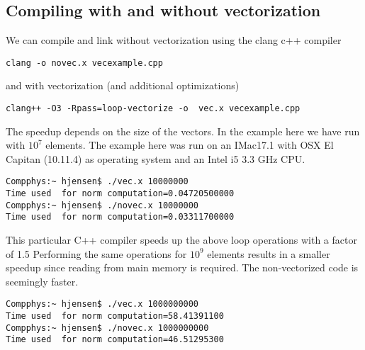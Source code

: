 \documentclass[%
oneside,                 %
final,                   %
10pt]{article}
\begin{document}
\subsection*{Compiling with and without vectorization}
We can compile and link without vectorization using the clang c++ compiler


\begin{verbatim}
clang -o novec.x vecexample.cpp

\end{verbatim}

and with vectorization (and additional optimizations)


\begin{verbatim}
clang++ -O3 -Rpass=loop-vectorize -o  vec.x vecexample.cpp 

\end{verbatim}

The speedup depends on the size of the vectors. In the example here we have run with $10^7$ elements.
The example here was run on an IMac17.1 with OSX El Capitan (10.11.4) as operating system and an Intel i5 3.3 GHz CPU.  





\begin{verbatim}
Compphys:~ hjensen$ ./vec.x 10000000
Time used  for norm computation=0.04720500000
Compphys:~ hjensen$ ./novec.x 10000000
Time used  for norm computation=0.03311700000

\end{verbatim}

This particular C++ compiler speeds up the above loop operations with a factor of 1.5 
Performing the same operations for $10^9$ elements results in a smaller speedup since reading from main memory is required. The non-vectorized code is seemingly faster. 





\begin{verbatim}
Compphys:~ hjensen$ ./vec.x 1000000000
Time used  for norm computation=58.41391100
Compphys:~ hjensen$ ./novec.x 1000000000
Time used  for norm computation=46.51295300

\end{verbatim}
\end{document}
